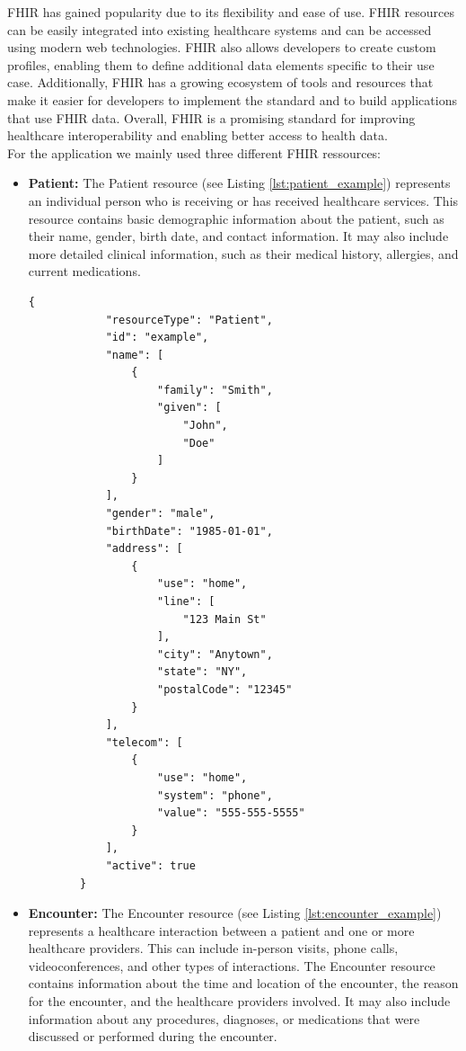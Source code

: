 \documentclass[]{report}
\begin{document}
FHIR has gained popularity due to its flexibility and ease of use. FHIR resources can be easily integrated into existing healthcare systems and can be accessed using modern web technologies. FHIR also allows developers to create custom profiles, enabling them to define additional data elements specific to their use case. Additionally, FHIR has a growing ecosystem of tools and resources that make it easier for developers to implement the standard and to build applications that use FHIR data. Overall, FHIR is a promising standard for improving healthcare interoperability and enabling better access to health data.\\
For the application we mainly used three different FHIR ressources:
\begin{itemize}
    \item \textbf{Patient:} The Patient resource (see Listing \ref{lst:patient_example}) represents an individual person who is receiving or has received healthcare services. This resource contains basic demographic information about the patient, such as their name, gender, birth date, and contact information. It may also include more detailed clinical information, such as their medical history, allergies, and current medications. \begin{lstlisting}[style=json, label=lst:patient_example, caption={Example for a FHIR patient ressource}]
        {
            "resourceType": "Patient",
            "id": "example",
            "name": [
                {
                    "family": "Smith",
                    "given": [
                        "John",
                        "Doe"
                    ]
                }
            ],
            "gender": "male",
            "birthDate": "1985-01-01",
            "address": [
                {
                    "use": "home",
                    "line": [
                        "123 Main St"
                    ],
                    "city": "Anytown",
                    "state": "NY",
                    "postalCode": "12345"
                }
            ],
            "telecom": [
                {
                    "use": "home",
                    "system": "phone",
                    "value": "555-555-5555"
                }
            ],
            "active": true
        }
    \end{lstlisting}
    \item \textbf{Encounter:} The Encounter resource (see Listing \ref{lst:encounter_example}) represents a healthcare interaction between a patient and one or more healthcare providers. This can include in-person visits, phone calls, videoconferences, and other types of interactions. The Encounter resource contains information about the time and location of the encounter, the reason for the encounter, and the healthcare providers involved. It may also include information about any procedures, diagnoses, or medications that were discussed or performed during the encounter. \begin{lstlisting}[style=json, label=lst:encounter_example, caption={Example for a FHIR encounter ressource}]

\end{lstlisting}
\end{itemize}
\end{document}
